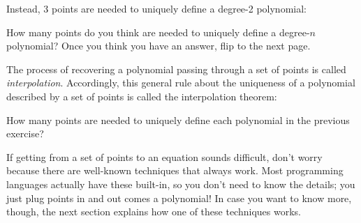 Instead, 3 points are needed to uniquely define a degree-2 polynomial:

\begin{center}
\end{center}

How many points do you think are needed to uniquely define a degree-$n$
polynomial? Once you think you have an answer, flip to the next page.

\newpage
The process of recovering a polynomial passing through a set of points is 
called \emph{interpolation}. Accordingly, this general rule about the 
uniqueness of a polynomial described by a set of points is called the 
interpolation theorem:

\setlength\fboxsep{1em}        
\begin{center}
\end{center}

\begin{exercise}
    How many points are needed to uniquely define each polynomial 
    in the previous exercise?
\end{exercise}

If getting from a set of points to an equation sounds difficult, don't worry because 
there are well-known techniques that always work. Most programming languages 
actually have these built-in, so you don't need to know the details; you just 
plug points in and out comes a polynomial! In case you want to know more, though,
the next section explains how one of these techniques works.

